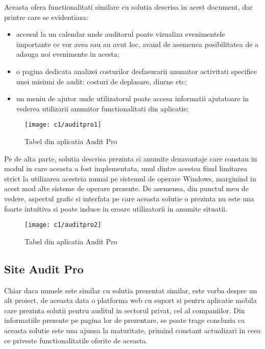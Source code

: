 	Aceasta ofera functionalitati similare cu solutia descrisa in acest document, dar printre care se evidentiaza: 
	\begin{itemize}
		\item accesul la un calendar unde auditorul poate vizualiza evenimentele importante ce vor avea sau au avut loc, avand de asemenea posibilitatea de a adauga noi evenimente in acesta;
		
		\item o pagina dedicata analizei costurilor desfasurarii anumitor activitati specifice unei misiuni de audit: costuri de deplasare, diurne etc;
		
		\item un meniu de ajutor unde utilizatorul poate accesa informatii ajutatoare in vederea utilizarii anumitor functionalitati din aplicatie;
		
	\end{itemize}
	
	\vspace{1cm}
	\begin{figure}[h]
		\centering
		
		\texttt{[image: c1/auditpro1]}
		\caption{Tabel din aplicatia Audit Pro}
	\end{figure}
	
	
	
Pe de alta parte, solutia descrisa prezinta si anumite dezavantaje care constau in modul in care aceasta a fost implementata, unul dintre acestea fiind limitarea strict la utilizarea acesteia numai pe sistemul de operare Windows, marginind in acest mod alte sisteme de operare prezente.
De asemenea, din punctul meu de vedere, aspectul grafic si interfata pe care aceasta solutie o prezinta nu este una foarte intuitiva si poate induce in eroare utilizatorii in anumite situatii.
\vspace{1cm}
\begin{figure}[h]
	\centering
	
	\texttt{[image: c1/auditpro2]}
	\caption{Tabel din aplicatia Audit Pro}
\end{figure}

	\newpage
	\subsection*{Site Audit Pro }
	
	Chiar daca numele este similar cu solutia prezentat similar, este vorba despre un alt proiect, de aceasta data o platforma web cu suport si pentru aplicatie mobila care prezinta solutii pentru auditul in sectorul privat, cel al companiilor.
	Din informatiile prezente pe pagina  lor de prezentare, se poate trage concluzia ca aceasta solutie este una ajunsa la maturitate, primind constant actualizari in ceea ce priveste functionalitatile oferite de aceasta.
	 
